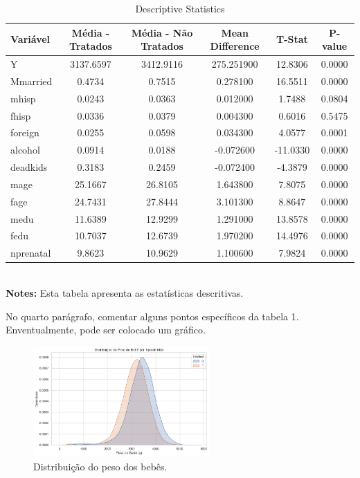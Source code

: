 \documentclass[a4paper]{article}
\begin{document}
\begin{table}[h]
\centering
\caption{Descriptive Statistics}
\begin{tabular}{lccccc}
      \toprule
      Variável & Média - Tratados & Média - Não Tratados & Mean Difference & T-Stat & P-value \\
      \midrule
      Y & 3137.6597 & 3412.9116 & 275.251900 & 12.8306 & 0.0000 \\
      Mmarried & 0.4734 & 0.7515 & 0.278100 & 16.5511 & 0.0000 \\
      mhisp & 0.0243 & 0.0363 & 0.012000 & 1.7488 & 0.0804 \\
      fhisp & 0.0336 & 0.0379 & 0.004300 & 0.6016 & 0.5475 \\
      foreign & 0.0255 & 0.0598 & 0.034300 & 4.0577 & 0.0001 \\
      alcohol & 0.0914 & 0.0188 & -0.072600 & -11.0330 & 0.0000 \\
      deadkids & 0.3183 & 0.2459 & -0.072400 & -4.3879 & 0.0000 \\
      mage & 25.1667 & 26.8105 & 1.643800 & 7.8075 & 0.0000 \\
      fage & 24.7431 & 27.8444 & 3.101300 & 8.8647 & 0.0000 \\
      medu & 11.6389 & 12.9299 & 1.291000 & 13.8578 & 0.0000 \\
      fedu & 10.7037 & 12.6739 & 1.970200 & 14.4976 & 0.0000 \\
      nprenatal & 9.8623 & 10.9629 & 1.100600 & 7.9824 & 0.0000 \\
      \bottomrule
\end{tabular} \\
\textbf{Notes:} Esta tabela apresenta as estatísticas descritivas.
\end{table}

No quarto parágrafo, comentar alguns pontos específicos da tabela 1. Enventualmente, pode ser colocado um gráfico.


\begin{figure}
      \centering
      \includegraphics[width=0.6\textwidth]{Fig.png}
      \caption{\label{fig:Distribution} Distribuição do peso dos bebês.}
      \end{figure}
\end{document}
